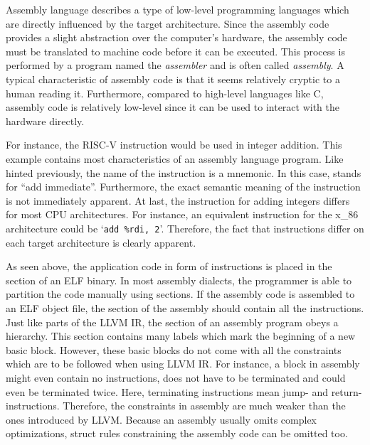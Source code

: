 Assembly language describes a type of low-level programming languages which are directly influenced by the target architecture.
Since the assembly code provides a slight abstraction over the computer's hardware,
the assembly code must be translated to machine code before it can be executed.
This process is performed by a program named the \emph{assembler} and is often called \emph{assembly}.
A typical characteristic of assembly code is that it seems relatively cryptic to a human reading it.
Furthermore, compared to high-level languages like C, assembly code is relatively low-level since it can be used to interact with the hardware directly.

For instance, the RISC-V instruction  would be used in integer addition.
This example contains most characteristics of an assembly language program.
Like hinted previously, the name of the instruction is a mnemonic.
In this case,  stands for \enquote{add immediate}.
Furthermore, the exact semantic meaning of the instruction is not immediately apparent.
At last, the instruction for adding integers differs for most CPU architectures.
For instance, an equivalent instruction for the x\_86 architecture could be `\texttt{add \%rdi, 2}'.
Therefore, the fact that instructions differ on each target architecture is clearly apparent.

As seen above, the application code in form of instructions is placed in the  section of an ELF binary.
In most assembly dialects, the programmer is able to partition the code manually using sections.
If the assembly code is assembled to an ELF object file, the  section of the assembly should contain all the instructions.
Just like parts of the LLVM IR, the  section of an assembly program obeys a hierarchy.
This section contains many labels which mark the beginning of a new basic block.
However, these basic blocks do not come with all the constraints which are to be followed when using LLVM IR\@.
For instance, a block in assembly might even contain no instructions, does not have to be terminated and could even be terminated twice.
Here, terminating instructions mean jump- and return-instructions.
Therefore, the constraints in assembly are much weaker than the ones introduced by LLVM\@.
Because an assembly usually omits complex optimizations, struct rules constraining the assembly code can be omitted too.

